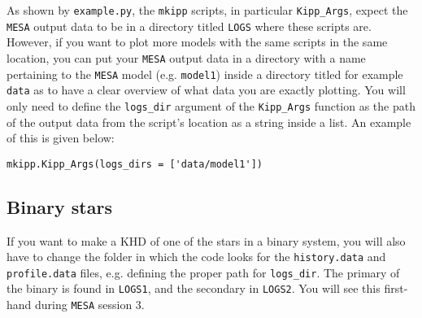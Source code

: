 \documentclass[11pt,a4paper]{article}
\begin{document}
\bigskip\noindent
As shown by \texttt{example.py}, the \texttt{mkipp} scripts, in particular \texttt{Kipp\_Args}, expect the \texttt{MESA} output data to be in a directory titled \texttt{LOGS} where these scripts are. However, if you want to plot more models with the same scripts in the same location, you can put your \texttt{MESA} output data in a directory with a name pertaining to the \texttt{MESA} model (e.g. \texttt{model1}) inside a directory titled for example \texttt{data} as to have a clear overview of what data you are exactly plotting. You will only need to define the \texttt{logs\_dir} argument of the \texttt{Kipp\_Args} function as the path of the output data from the script's location as a string inside a list. An example of this is given below:
\begin{verbatim}
mkipp.Kipp_Args(logs_dirs = ['data/model1'])
\end{verbatim}

\subsection{Binary stars}
If you want to make a KHD of one of the stars in a binary system, you will also have to change the folder in which the code looks for the \texttt{history.data} and \texttt{profile.data} files, e.g. defining the proper path for \texttt{logs\_dir}. The primary of the binary is found in \texttt{LOGS1}, and the secondary in \texttt{LOGS2}. You will see this first-hand during \texttt{MESA} session 3.




\end{document}
